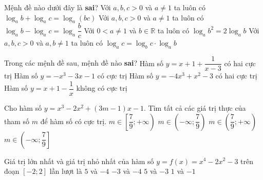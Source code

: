 \begin{ex}%
Mệnh đề nào dưới đây là \textbf{sai}?
\choice
{Với $a,b,c>0$ và $a\neq 1$ ta luôn có $\log_ab+\log_ac=\log_a(bc)$}
{Với $a,b,c>0$ và $a\neq 1$ ta luôn có $\log_ab-\log_ac=\log_a\dfrac{b}{c}$}
{\True Với $0<a\neq 1$ và $b\in\mathbb{R}$ ta luôn có $\log_ab^2=2\log_ab$ }
{Với $a,b,c>0$ và $a,b\neq 1$ ta luôn có $\log_ac=\log_bc\cdot\log_ab$}
\end{ex}


\begin{ex}%
Trong các mệnh đề sau, mệnh đề nào \textbf{sai}?
\choice
{Hàm số $y=x+1+\dfrac{1}{x-3}$ có hai cực trị}
{\True Hàm số $y=-x^3-3x-1$ có cực trị}
{Hàm số $y=-4x^3+x^2-3$ có hai cực trị}
{Hàm số $y=x+1-\dfrac{1}{x}$ không có cực trị}
\end{ex}

\begin{ex}%
Cho hàm số $y=x^3-2x^2+(3m-1)x-1$. Tìm tất cả các giá trị thực của tham số $m$ để hàm số có cực trị.
\choice
{$m\in\left[\dfrac{7}{9};+\infty\right)$}
{\True $m\in\left(-\infty;\dfrac{7}{9}\right)$}
{$m\in\left(\dfrac{7}{9};+\infty\right)$}
{$m\in\left(-\infty;\dfrac{7}{9}\right]$}
\end{ex}

\begin{ex}%
Giá trị lớn nhất và giá trị nhỏ nhất của hàm số $y=f(x)=x^4-2x^2-3$ trên đoạn $[-2;2]$ lần lượt là
\choice
{\True $5$ và $-4$}
{ $-3$ và $-4$ }
{  $5$ và $-3$}
{ $1$ và $-1$}
\end{ex}

